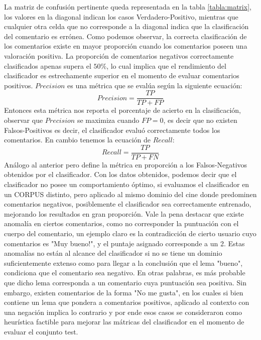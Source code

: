 \documentclass[12pt]{article}
\begin{document}
La matriz de confusión pertinente queda representada en la tabla \ref{tabla:matrix}, los valores en la diagonal indican los casos Verdadero-Positivo, mientras que cualquier otra celda que no corresponde a la diagonal indica que la clasificación del comentario es errónea. Como podemos observar, la correcta clasificación de los comentarios existe en mayor proporción cuando los comentarios poseen una valoración positiva. La proporción de comentarios negativos correctamente clasificados apenas supera el $50 \%$, lo cual implica que el rendimiento del clasificador es estrechamente superior en el momento de evaluar comentarios positivos.
$Precision$ es una métrica que se evalúa según la siguiente ecuación:
\begin{equation}
  Precision = \frac{TP}{TP + FP}
\end{equation}
Entonces esta métrica nos reporta el porcentaje de acierto en la clasificación, observar que $Precision$ se maximiza cuando $FP=0$, es decir que no existen Falsos-Positivos es decir, el clasificador evaluó correctamente todos los comentarios.
En cambio tenemos la ecuación de $Recall$:
\begin{equation}
  Recall = \frac{TP}{TP + FN}
\end{equation} 
Análogo al anterior pero define la métrica en proporción a los Falsos-Negativos obtenidos por el clasificador.
Con los datos obtenidos, podemos decir que el clasificador no posee un comportamiento óptimo, si evaluamos el clasificador en un CORPUS distinto, pero aplicado al mismo dominio del cine donde predominen comentarios negativos, posiblemente el clasificador sea correctamente entrenado, mejorando los resultados en gran proporción.
Vale la pena destacar que existe anomalía en ciertos comentarios, como no corresponder la puntuación con el cuerpo del comentario, un ejemplo claro es la contradicción de cierto usuario cuyo comentarios es "Muy bueno!", y el puntaje asignado corresponde a un 2. Estas anomalías no están al alcance del clasificador si no se tiene un dominio suficientemente extenso como para llegar a la conclusión que el lema "bueno", condiciona que el comentario sea negativo. En otras palabras, es más probable que dicho lema corresponda a un comentario cuya puntuación sea positiva. Sin embargo, existen comentarios de la forma "No me gusta", en los cuales si bien contiene un lema que pondera a comentarios positivos, aplicado al contexto con una negación implica lo contrario y por ende esos casos se consideraron como heurística factible para mejorar las mátricas del clasificador en el momento de evaluar el conjunto test.
\end{document}
